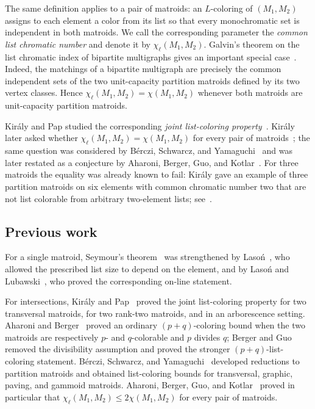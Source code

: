 \documentclass{article}
\theoremstyle{plain}
\theoremstyle{definition}
\begin{document}
The same definition applies to a pair of matroids: an $L$-coloring of $(M_1,M_2)$ assigns to each element a color from its list so that every monochromatic set is independent in both matroids. We call the corresponding parameter the \textit{common list chromatic number} and denote it by $\chi_\ell(M_1,M_2)$. Galvin's theorem on the list chromatic index of bipartite multigraphs gives an important special case~\cite{galvin1995list}. Indeed, the matchings of a bipartite multigraph are precisely the common independent sets of the two unit-capacity partition matroids defined by its two vertex classes. Hence $\chi_\ell(M_1,M_2)=\chi(M_1,M_2)$ whenever both matroids are unit-capacity partition matroids.

Kir\'aly and Pap studied the corresponding \textit{joint list-coloring property}~\cite{kiraly2010list}. Kir\'aly later asked whether $\chi_\ell(M_1,M_2)=\chi(M_1,M_2)$ for every pair of matroids~\cite{kiraly2013open}; the same question was considered by B\'erczi, Schwarcz, and Yamaguchi~\cite{berczi2021list} and was later restated as a conjecture by Aharoni, Berger, Guo, and Kotlar~\cite[Conjecture~5.4]{aharoni2025coloring}. For three matroids the equality was already known to fail: Kir\'aly gave an example of three partition matroids on six elements with common chromatic number two that are not list colorable from arbitrary two-element lists; see~\cite{berczi2021list}.

\subsection{Previous work}

For a single matroid, Seymour's theorem~\cite{seymour1998note} was strengthened by Laso\'n~\cite{lason2015list}, who allowed the prescribed list size to depend on the element, and by Laso\'n and Lubawski~\cite{lason2017online}, who proved the corresponding on-line statement.

For intersections, Kir\'aly and Pap~\cite{kiraly2010list} proved the joint list-coloring property for two transversal matroids, for two rank-two matroids, and in an arborescence setting. Aharoni and Berger~\cite{aharoni2006intersection} proved an ordinary $(p+q)$-coloring bound when the two matroids are respectively $p$- and $q$-colorable and $p$ divides $q$; Berger and Guo~\cite{berger2025coloring} removed the divisibility assumption and proved the stronger $(p+q)$-list-coloring statement. B\'erczi, Schwarcz, and Yamaguchi~\cite{berczi2021list} developed reductions to partition matroids and obtained list-coloring bounds for transversal, graphic, paving, and gammoid matroids. Aharoni, Berger, Guo, and Kotlar~\cite{aharoni2025coloring} proved in particular that $\chi_\ell(M_1,M_2)\le2\chi(M_1,M_2)$ for every pair of matroids.
\end{document}
